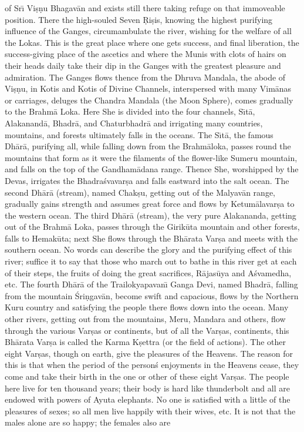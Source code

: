 of Sr\={\i} Vi\d{s}\d{n}u Bhagav\=an and exists still there taking refuge on that immoveable position. There the high-souled Seven \d{R}i\d{s}is, knowing the highest purifying influence of the Ganges, circumambulate the river, wishing for the welfare of all the Lokas. This is the great place where one gets success, and final liberation, the success-giving place of the ascetics and where the Munis with clots of hairs on their heads daily take their dip in the Ganges with the greatest pleasure and admiration. The Ganges flows thence from the Dhruva Mandala, the abode of Vi\d{s}\d{n}u, in Kotis and Kotis of Divine Channels, interspersed with many Vim\=anas or carriages, deluges the Chandra Mandala (the Moon Sphere), comes gradually to the Brahm\=a Loka. Here She is divided into the four channels, S\={\i}t\=a, Alakanand\=a, Bhadr\=a, and Chaturbhadr\=a and irrigating many countries, mountains, and forests ultimately falls in the oceans. The S\={\i}t\=a, the famous Dh\=ar\=a, purifying all, while falling down from the Brahm\=aloka, passes round the mountains that form as it were the filaments of the flower-like Sumeru mountain, and falls on the top of the Gandham\=adana range. Thence She, worshipped by the Devas, irrigates the Bhadra\'svavar\d{s}a and falls eastward into the salt ocean. The second Dh\=ar\=a (stream), named Chak\d{s}u, getting out of the Malyav\=an range, gradually gains strength and assumes great force and flows by Ketum\=alavar\d{s}a to the western ocean. The third Dh\=ar\=a (stream), the very pure Alakananda, getting out of the Brahm\=a Loka, passes through the Girik\=uta mountain and other forests, falls to Hemak\=uta; next She flows through the Bh\=arata Var\d{s}a and meets with the southern ocean. No words can describe the glory and the purifying effect of this river; suffice it to say that those who march out to bathe in this river get at each of their steps, the fruits of doing the great sacrifices, R\=ajas\=uya and A\'svamedha, etc. The fourth Dh\=ar\=a of the Trailokyapavan\={\i} Ganga Devi, named Bhadr\=a, falling from the mountain \'Sri\d{n}gav\=an, become swift and capacious, flows by the Northern Kuru country and satisfying the people there flows down into the ocean. Many other rivers, getting out from the mountains, Meru, Mandara and others, flow through the various Var\d{s}as or continents, but of all the Var\d{s}as, continents, this Bh\=arata Var\d{s}a is called the Karma K\d{s}ettra (or the field of actions). The other eight Var\d{s}as, though on earth, give the pleasures of the Heavens. The reason for this is that when the period of the person\'s enjoyments in the Heavens cease, they come and take their birth in the one or other of these eight Var\d{s}as. The people here live for ten thousand years; their body is hard like thunderbolt and all are endowed with powers of Ayuta elephants. No one is satisfied with a little of the pleasures of sexes; so all men live happily with their wives, etc. It is not that the males alone are so happy; the females also are

